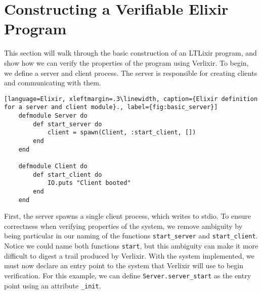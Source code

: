 \section{Constructing a Verifiable Elixir Program} \label{sec:verifiable}
This section will walk through the basic construction of an LTLixir program, and show how we can verify the properties of the program using Verlixir. To begin, we define a server and client process. The server is responsible for creating clients and communicating with them. 
\begin{lstlisting}[language=Elixir, xleftmargin=.3\linewidth, caption={Elixir definition for a server and client module}., label={fig:basic_server}]
    defmodule Server do
        def start_server do
            client = spawn(Client, :start_client, [])
        end
    end

    defmodule Client do
        def start_client do
            IO.puts "Client booted"
        end
    end
\end{lstlisting}
First, the server spawns a single client process, which writes to stdio. To ensure correctness when verifying properties of the system, we remove ambiguity by being particular in our naming of the functions \texttt{start\_server} and \texttt{start\_client}. Notice we could name both functions \texttt{start}, but this ambiguity can make it more difficult to digest a trail produced by Verlixir. With the system implemented, we must now declare an entry point to the system that Verlixir will use to begin verification. For this example, we can define \texttt{Server.server\_start} as the entry point using an attribute \texttt{\@vae\_init}.

